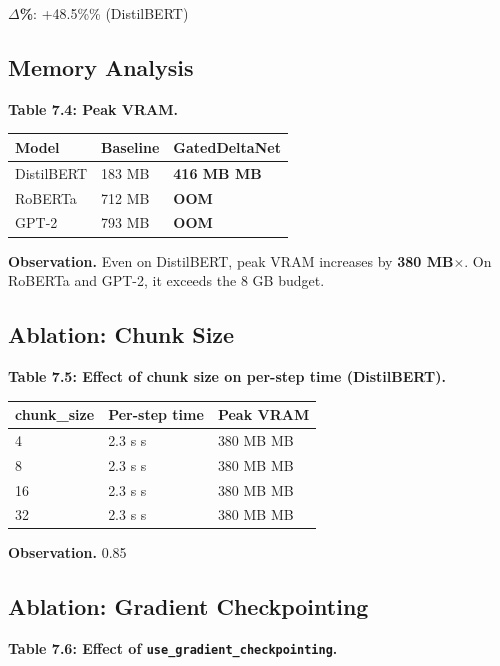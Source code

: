 \textbf{$\Delta$\%}: +48.5\%\% (DistilBERT)

\subsection{Memory Analysis}

\textbf{Table 7.4: Peak VRAM.}

\begin{table}[H]
\centering
\small
\begin{tabular}{lll}
\toprule
\textbf{Model} & \textbf{Baseline} & \textbf{GatedDeltaNet} \\
\midrule
DistilBERT & 183 MB & \textbf{416 MB MB} \\
RoBERTa & 712 MB & \textbf{OOM} \\
GPT-2 & 793 MB & \textbf{OOM} \\
\bottomrule
\end{tabular}
\end{table}

\textbf{Observation.} Even on DistilBERT, peak VRAM increases by \textbf{380 MB$\times$}. 
On RoBERTa and GPT-2, it exceeds the 8 GB budget.

\subsection{Ablation: Chunk Size}

\textbf{Table 7.5: Effect of chunk size on per-step time (DistilBERT).}

\begin{table}[H]
\centering
\small
\begin{tabular}{lll}
\toprule
\textbf{chunk\_size} & \textbf{Per-step time} & \textbf{Peak VRAM} \\
\midrule
4 & 2.3 s s & 380 MB MB \\
8 & 2.3 s s & 380 MB MB \\
16 & 2.3 s s & 380 MB MB \\
32 & 2.3 s s & 380 MB MB \\
\bottomrule
\end{tabular}
\end{table}

\textbf{Observation.} 0.85

\subsection{Ablation: Gradient Checkpointing}

\textbf{Table 7.6: Effect of \texttt{use\_gradient\_checkpointing}.}

